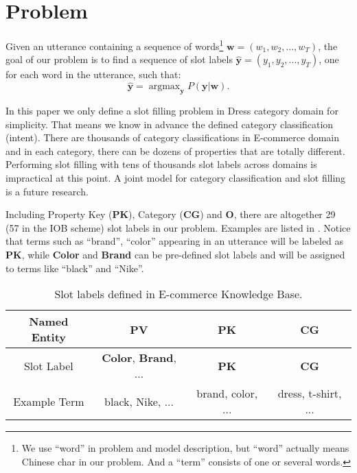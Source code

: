 \section{Problem}
\label{sec:problem}
Given an utterance containing a sequence of
words\footnote{We use ``word'' in problem and model description,
	but ``word'' actually means Chinese char in our problem.
And a ``term'' consists of one or several words.} 
$\textbf{w} = (w_1, w_2, ..., w_T)$,
the goal of our problem
is to find a sequence of slot labels $\hat{\textbf{y}} = (y_1, y_2, ..., y_T)$, 
one for each word in the utterance, such that:
\begin{equation*}
	\hat{\textbf{y}} = \mathop{\arg\max}_{\textbf{y}}P(\textbf{y}|\textbf{w}).
\end{equation*}

In this paper we only define a slot filling problem in Dress category domain 
for simplicity.
That means we know in advance the defined category classification (intent).
There are thousands of category classifications in E-commerce domain
and in each category, there can be dozens of properties that 
are totally different.  Performing slot filling with tens of thousands 
slot labels across domains is impractical at this point.
A joint model for category classification and slot filling is 
a future research. 

Including Property Key (\textbf{PK}), Category (\textbf{CG}) and \textbf{O},
there are altogether 29 (57 in the IOB scheme) slot labels in our problem. 
Examples are listed in .
Notice that terms such as ``brand'', ``color''
appearing in an utterance
will be labeled as \textbf{PK},
while \textbf{Color} and \textbf{Brand} can be pre-defined slot labels
and will be assigned to terms like
``black'' and ``Nike''.
\begin{table}[htbp]
	\centering
	\scriptsize
	\caption{Slot labels defined in E-commerce Knowledge Base.}
	\begin{tabular}{c|c|c|c}
		\toprule
		Named Entity & PV & PK & CG \\
		\midrule
		Slot Label & \textbf{Color}, \textbf{Brand}, ... & \textbf{PK} & \textbf{CG} \\
		\midrule
		Example Term & black, Nike, ... & brand, color, ... & dress, t-shirt, ... \\
		\bottomrule
	\end{tabular}
	\label{slot-labels}
	\vspace{-10pt}
\end{table}


